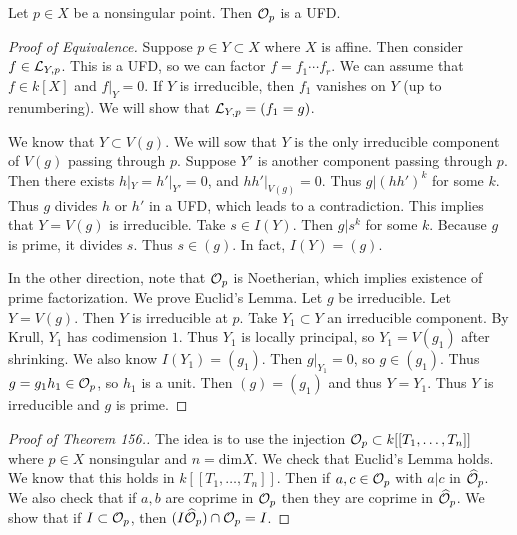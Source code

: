 \documentclass[twoside, 10pt]{article}
\begin{document}
    \begin{thm} Let $p \in X$ be a nonsingular point. Then
        $\mathcal{O}_p$ is a UFD.  \begin{proof}[Proof of Equivalence] Suppose $p
            \in Y \subset X$ where $X$ is affine. Then consider $f \in
            \mathcal{L}_{Y,p}$. This is a UFD, so we can factor $f = f_1 \cdots
            f_r$. We can assume that $f \in k[X]$ and $f|_Y = 0$. If $Y$ is
            irreducible, then $f_1$ vanishes on $Y$ (up to renumbering). We
            will show that $\mathcal{L}_{Y,p} = (f_1=g)$.
            
            We know that $Y \subset V(g)$. We will sow that $Y$ is the only
            irreducible component of $V(g)$ passing through $p$. Suppose $Y'$
            is another component passing through $p$. Then there exists $h|_Y =
            h'|_{Y'} = 0$, and $hh'|_{V(g)} = 0$. Thus $g | (hh')^k$ for some
            $k$. Thus $g$ divides $h$ or $h'$ in a UFD, which leads to a
            contradiction. This implies that $Y = V(g)$ is irreducible. Take $s
            \in I(Y)$. Then $g|s^k$ for some $k$. Because $g$ is prime, it
            divides $s$. Thus $s \in (g)$. In fact, $I(Y) = (g)$.

            In the other direction, note that $\mathcal{O}_p$ is Noetherian, which
            implies existence of prime factorization. We prove Euclid's Lemma.
            Let $g$ be irreducible. Let $Y = V(g)$. Then $Y$ is irreducible at
            $p$. Take $Y_1 \subset Y$ an irreducible component. By Krull, $Y_1$
            has codimension $1$. Thus $Y_1$ is locally principal, so $Y_1 =
            V(g_1)$ after shrinking. We also know $I(Y_1) = (g_1)$. Then
            $g|_{Y_1} = 0$, so $g \in (g_1)$. Thus $g = g_1h_1 \in \mathcal{O}_p$,
        so $h_1$ is a unit. Then $(g) = (g_1)$ and thus $Y = Y_1$. Thus $Y$ is
    irreducible and $g$ is prime.  \end{proof}

        \begin{proof}[Proof of Theorem 156.] The idea is to use the injection
            $\mathcal{O}_p \subset k[[T_1, \ldots, T_n]]$ where $p \in X$
            nonsingular and $n = \mathrm{dim} X$. We check that Euclid's Lemma
            holds. We know that this holds in $k[[T_1, \ldots, T_n]]$. Then if
            $a,c \in \mathcal{O}_p$ with $a|c$ in $\widehat{\mathcal{O}}_p$. We also
            check that if $a,b$ are coprime in $\mathcal{O}_p$ then they are coprime
            in $\widehat{\mathcal{O}}_p$. We show that if $I \subset \mathcal{O}_p$, then
            $(I\widehat{\mathcal{O}}_p) \cap \mathcal{O}_p = I$.


\end{proof}
\end{thm}
\end{document}
